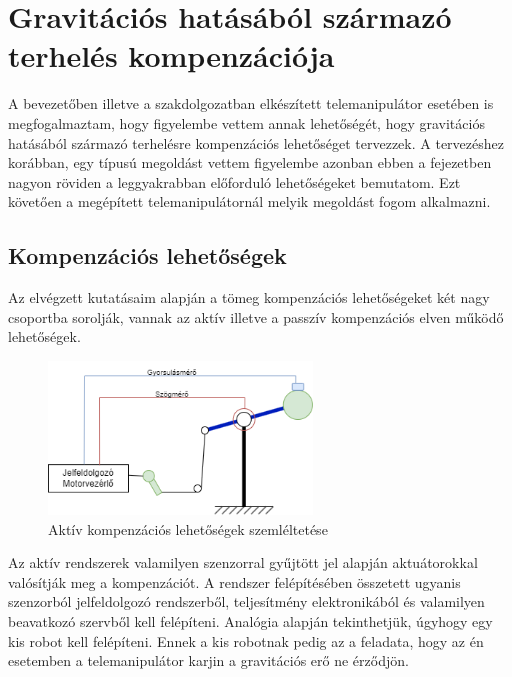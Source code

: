 \chapter{Gravitációs hatásából származó terhelés kompenzációja}
\label{sec:LatexTools}

A bevezetőben illetve a szakdolgozatban elkészített telemanipulátor esetében is megfogalmaztam, hogy figyelembe vettem annak lehetőségét, hogy gravitációs hatásából származó terhelésre kompenzációs lehetőséget tervezzek. A tervezéshez korábban, egy típusú megoldást vettem figyelembe azonban ebben a fejezetben nagyon röviden a leggyakrabban előforduló lehetőségeket bemutatom. Ezt követően a megépített telemanipulátornál melyik megoldást fogom alkalmazni.

\section{Kompenzációs lehetőségek}

Az elvégzett kutatásaim alapján a tömeg kompenzációs lehetőségeket két nagy csoportba sorolják, vannak az aktív illetve a passzív kompenzációs elven működő lehetőségek.

\begin{figure}[!h]
\centering
\includegraphics[width=70mm, keepaspectratio]{figures/Diagrammok/Kompenzacios_lehetosegek_aktiv}
\caption{Aktív kompenzációs lehetőségek szemléltetése}
\label{fig:Kompenzacios_lehetosegek_aktív}
\end{figure}

Az aktív rendszerek valamilyen szenzorral gyűjtött jel alapján aktuátorokkal valósítják meg a kompenzációt. A rendszer felépítésében összetett ugyanis szenzorból jelfeldolgozó rendszerből, teljesítmény elektronikából és valamilyen beavatkozó szervből kell felépíteni. Analógia alapján tekinthetjük, úgyhogy egy kis robot kell felépíteni. Ennek a kis robotnak pedig az a feladata, hogy az én esetemben a telemanipulátor karjin a gravitációs erő ne érződjön.


